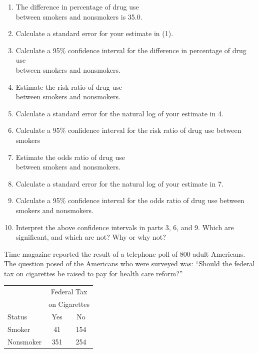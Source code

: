 \documentclass[11pt, chapterprefix=true]{scrbook}\usepackage[]{graphicx}\usepackage[]{color}
\begin{document}
\begin{exercises}
\begin{solution}
\begin{enumerate}
\item The difference in percentage of  drug  use \\ between smokers and nonsmokers is 35.0.
\item Calculate a standard error for your estimate in (1).
\item Calculate a 95\% confidence interval for the difference in percentage of drug use \\ between smokers and nonsmokers.
\item Estimate the risk ratio of drug use \\ between smokers and nonsmokers.
\item Calculate a standard error for the natural log of your estimate in 4.
\item Calculate a 95\% confidence interval for the risk ratio of drug use between smokers
\item Estimate the odds ratio of drug use \\ between smokers and nonsmokers.
\item Calculate a standard error for the natural log of your estimate in 7.
\item Calculate a 95\% confidence interval for the odds ratio of drug use between smokers and nonsmokers.
\item Interpret the above confidence intervals in parts 3, 6, and 9. Which are significant, and which are not? Why or why not?
\end{enumerate}

  \end{solution}

  \begin{exercise} %

Time magazine reported the result of a telephone poll of 800 adult Americans. The question posed of the Americans who were surveyed was: ``Should the federal tax on cigarettes be raised to pay for health care reform?''

\begin{table}[ht]
\centering
\begin{tabular}{@{} lcc @{}} \hline
 & \multicolumn{2}{c}{Federal Tax} \\
  & \multicolumn{2}{c}{on Cigarettes} \\
Status & Yes & No \\ \hline
Smoker & 41 & 154 \\
Nonsmoker & 351 & 254 \\ \hline
\end{tabular}
\end{table}


\end{exercise}
\end{exercises}
\end{document}
